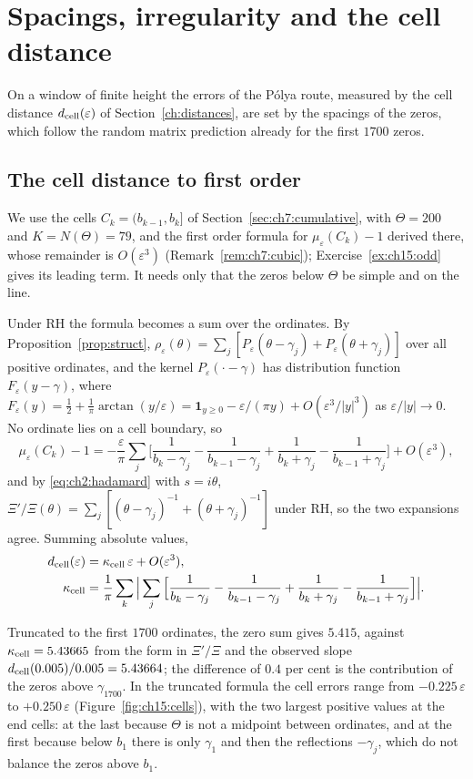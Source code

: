 \section{Spacings, irregularity and the cell distance}\label{ch:spacing}

On a window of finite height the errors of the P\'olya route, measured by the cell distance $d_{\rm cell}(\varepsilon)$ of Section~\ref{ch:distances}, are set by the spacings of the zeros, which follow the random matrix prediction already for the first $1700$ zeros.

\subsection{The cell distance to first order}\label{sec:ch15:first}

We use the cells $C_k=(b_{k-1},b_k]$ of Section~\ref{sec:ch7:cumulative}, with $\Theta=200$ and $K=N(\Theta)=79$, and the first order formula for $\mu_\varepsilon(C_k)-1$ derived there, whose remainder is $O(\varepsilon^3)$ (Remark~\ref{rem:ch7:cubic}); Exercise~\ref{ex:ch15:odd} gives its leading term. It needs only that the zeros below $\Theta$ be simple and on the line.

Under RH the formula becomes a sum over the ordinates. By Proposition~\ref{prop:struct}, $\rho_\varepsilon(\theta)=\sum_j[P_\varepsilon(\theta-\gamma_j)+P_\varepsilon(\theta+\gamma_j)]$ over all positive ordinates, and the kernel $P_\varepsilon(\cdot-\gamma)$ has distribution function $F_\varepsilon(y-\gamma)$, where $F_\varepsilon(y)=\frac12+\frac1\pi\arctan(y/\varepsilon)=\mathbf 1_{y\ge0}-\varepsilon/(\pi y)+O(\varepsilon^3/|y|^3)$ as $\varepsilon/|y|\to0$. No ordinate lies on a cell boundary, so
\[
\mu_\varepsilon(C_k)-1=-\frac\varepsilon\pi\sum_j\Big[\frac1{b_k-\gamma_j}-\frac1{b_{k-1}-\gamma_j}+\frac1{b_k+\gamma_j}-\frac1{b_{k-1}+\gamma_j}\Big]+O(\varepsilon^3),
\]
and by \eqref{eq:ch2:hadamard} with $s=i\theta$, $\Xi'/\Xi(\theta)=\sum_j[(\theta-\gamma_j)^{-1}+(\theta+\gamma_j)^{-1}]$ under RH, so the two expansions agree. Summing absolute values,
\[
\begin{aligned}
d_{\rm cell}(\varepsilon)&=\kappa_{\rm cell}\,\varepsilon+O(\varepsilon^3),\\
\kappa_{\rm cell}&=\frac1\pi\sum_k\Big|\sum_j\Big[\frac1{b_k-\gamma_j}-\frac1{b_{k-1}-\gamma_j}+\frac1{b_k+\gamma_j}-\frac1{b_{k-1}+\gamma_j}\Big]\Big| .
\end{aligned}
\]

Truncated to the first $1700$ ordinates, the zero sum gives $5.415$, against $\kappa_{\rm cell}=5.43665$ from the form in $\Xi'/\Xi$ and the observed slope $d_{\rm cell}(0.005)/0.005=5.43664$; the difference of $0.4$ per cent is the contribution of the zeros above $\gamma_{1700}$. In the truncated formula the cell errors range from $-0.225\,\varepsilon$ to $+0.250\,\varepsilon$ (Figure~\ref{fig:ch15:cells}), with the two largest positive values at the end cells: at the last because $\Theta$ is not a midpoint between ordinates, and at the first because below $b_1$ there is only $\gamma_1$ and then the reflections $-\gamma_j$, which do not balance the zeros above $b_1$.

